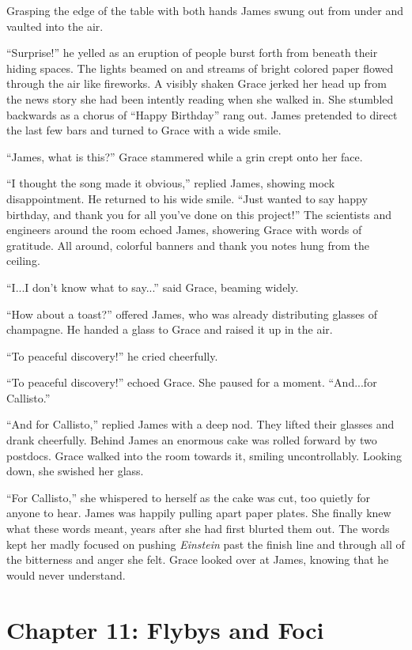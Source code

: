 \documentclass[12pt]{article} %
\begin{document}
Grasping the edge of the table with both hands James swung out from under and vaulted into the air.

``Surprise!'' he yelled as an eruption of people burst forth from beneath their hiding spaces. The lights beamed on and streams of bright colored paper flowed through the air like fireworks. A visibly shaken Grace jerked her head up from the news story she had been intently reading when she walked in. She stumbled backwards as a chorus of ``Happy Birthday'' rang out. James pretended to direct the last few bars and turned to Grace with a wide smile.

``James, what is this?'' Grace stammered while a grin crept onto her face.

``I thought the song made it obvious,'' replied James, showing mock disappointment. He returned to his wide smile. ``Just wanted to say happy birthday, and thank you for all you've done on this project!'' The scientists and engineers around the room echoed James, showering Grace with words of gratitude. All around, colorful banners and thank you notes hung from the ceiling.

``I...I don't know what to say...'' said Grace, beaming widely.

``How about a toast?'' offered James, who was already distributing glasses of champagne. He handed a glass to Grace and raised it up in the air.

``To peaceful discovery!'' he cried cheerfully.

``To peaceful discovery!'' echoed Grace. She paused for a moment. ``And...for Callisto.''

``And for Callisto,'' replied James with a deep nod. They lifted their glasses and drank cheerfully. Behind James an enormous cake was rolled forward by two postdocs. Grace walked into the room towards it, smiling uncontrollably. Looking down, she swished her glass.

``For Callisto,'' she whispered to herself as the cake was cut, too quietly for anyone to hear. James was happily pulling apart paper plates. She finally knew what these words meant, years after she had first blurted them out. The words kept her madly focused on pushing \textit{Einstein} past the finish line and through all of the bitterness and anger she felt. Grace looked over at James, knowing that he would never understand.

\newpage
\section{Chapter 11: Flybys and Foci}
\end{document}
